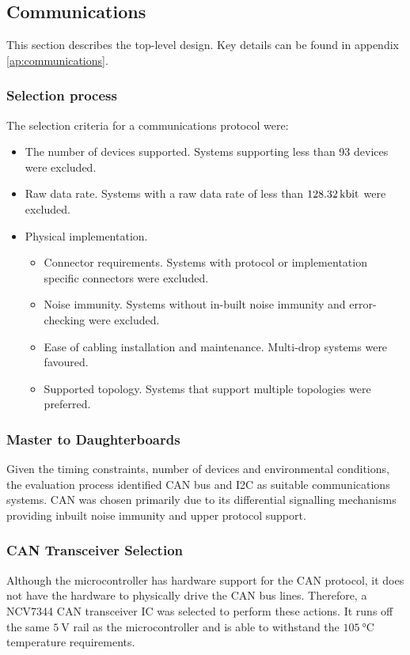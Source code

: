 \subsection{Communications}
This section describes the top-level design. Key details can be found in appendix \ref{ap:communications}.

\subsubsection{Selection process}
The selection criteria for a communications protocol were:
\begin{itemize}
	\item The number of devices supported. Systems supporting less than 93 devices were excluded.
	\item Raw data rate. Systems with a raw data rate of less than $\SI{128.32}{\kilo\bit}$ were excluded.
	\item Physical implementation. 
	\begin{itemize}
		\item Connector requirements. Systems with protocol or implementation specific connectors were excluded.
		\item Noise immunity. Systems without in-built noise immunity and error-checking were excluded.
		\item Ease of cabling installation and maintenance. Multi-drop systems were favoured.
		\item Supported topology. Systems that support multiple topologies were preferred.
	\end{itemize}
\end{itemize}

\subsubsection{Master to Daughterboards} 
Given the timing constraints, number of devices and environmental conditions, the evaluation process identified CAN bus and I2C as suitable communications systems.
CAN was chosen primarily due to its differential signalling mechanisms providing inbuilt noise immunity and upper protocol support. 

\subsubsection{CAN Transceiver Selection}
Although the microcontroller has hardware support for the CAN protocol, it does not have the hardware to physically drive the CAN bus lines.
Therefore, a NCV7344 CAN transceiver IC was selected to perform these actions.
It runs off the same $\SI{5}{\volt}$ rail as the microcontroller and is able to withstand the $\SI{105}{\degreeCelsius}$ temperature requirements.

